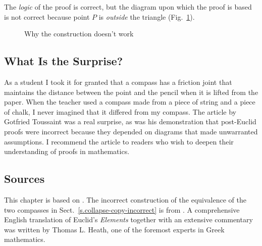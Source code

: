 The \emph{logic} of the proof is correct, but the diagram upon which the proof is based is not correct because point $P$ is \emph{outside} the triangle (Fig.~\ref{f.collapse-isoceles-2}).

\begin{figure}[t]
\begin{center}
\end{center}
\caption{Why the construction doesn't work}\label{f.collapse-isoceles-2}
\end{figure}


\newpage

\subsection*{What Is the Surprise?}

As a student I took it for granted that a compass has a friction joint that maintains the distance between the point and the pencil when it is lifted from the paper. When the teacher used a compass made from a piece of string and a piece of chalk, I never imagined that it differed from my compass. The article by Gotfried Toussaint was a real surprise, as was his demonstration that post-Euclid proofs were incorrect because they depended on diagrams that made unwarranted assumptions. I recommend the article to readers who wish to deepen their understanding of  proofs in mathematics.

\subsection*{Sources}

This chapter is based on \cite{toussaint}. The incorrect construction of the equivalence of the two compasses in Sect.~\ref{s.collapse-copy-incorrect} is from \cite{rusty}. A comprehensive English translation of Euclid's \textit{Elements} together with an extensive commentary \cite{euclid} was written by Thomas L. Heath, one of the foremost experts in Greek mathematics.
